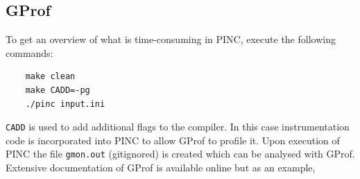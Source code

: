\documentclass[10pt,a4paper]{article}
\begin{document}
%
%
%
%

\subsection{GProf}
To get an overview of what is time-consuming in PINC, execute the following commands:

\begin{verbatim}
	make clean
	make CADD=-pg
	./pinc input.ini
\end{verbatim}
\verb$CADD$ is used to add additional flags to the compiler. In this case instrumentation code is incorporated into PINC to allow GProf to profile it. Upon execution of PINC the file \verb$gmon.out$ (gitignored) is created which can be analysed with GProf. Extensive documentation of GProf is available online but as an example,
\end{document}
